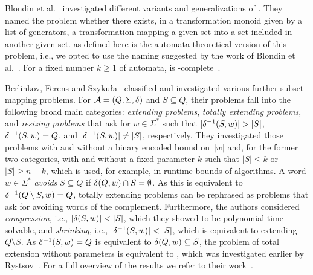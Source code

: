 Blondin et al.~\cite{BlondinKM16} investigated different variants and generalizations
of \DFAINT.
They named \ST the problem whether there exists, in a transformation monoid given by a list of generators,
a transformation mapping a given set into a set included in another given set. 
\ST as defined
here is the automata-theoretical version of this problem, i.e., we opted to use
the naming suggested by the work of Blondin et al.~\cite{BlondinKM16}.
For a fixed number $k \ge 1$ of automata, \DFAINT 
is \NL-complete~\cite[p.~464]{HolzerK11}.


Berlinkov, Ferens and Szyku\l a~\cite{BerlinkovFS21}
classified and investigated various further subset mapping problems.
For $\mathcal A = (Q, \Sigma, \delta)$ and $S \subseteq Q$,
their problems fall into the following broad main categories:
\emph{extending problems}, \emph{totally extending problems}, and \emph{resizing problems}
that ask for $w \in \Sigma^*$
such that $|\delta^{-1}(S,w)| > |S|$,
$\delta^{-1}(S,w) = Q$, and
$|\delta^{-1}(S,w)| \ne |S|$, respectively.
They investigated those problems with and without a binary encoded bound on~$|w|$
and, for the former two categories,
with and without a fixed parameter $k$ such that  $|S| \le k$ or $|S| \ge n - k$, which is used,
for example, in runtime bounds of algorithms.
A word $w \in \Sigma^*$ \emph{avoids} $S \subseteq Q$ 
if $\delta(Q,w) \cap S = \emptyset$.
As this is equivalent to $\delta^{-1}(Q \setminus S,w) = Q$,
totally extending problems can be rephrased
as problems that ask for avoiding words of the complement.
Furthermore, 
the authors considered \emph{compression}, i.e., $|\delta(S,w)| < |S|$,
which they showed to be polynomial-time solvable, and \emph{shrinking}, i.e., $|\delta^{-1}(S,w)| < |S|$,
which is equivalent to extending~$Q \setminus S$.
As $\delta^{-1}(S,w) = Q$
is equivalent to $\delta(Q,w) \subseteq S$,
the problem of total extension without parameters is
equivalent to \SIS, which was investigated earlier by Rystsov~\cite{Rys83}. %
For a full overview of the results we refer to their work~\cite{BerlinkovFS21}.

